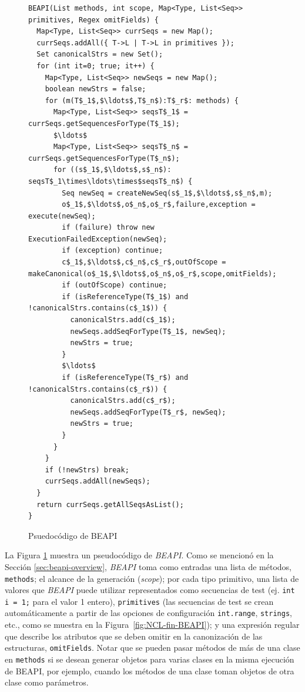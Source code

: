 \begin{figure}[ht]
\begin{lstlisting}
BEAPI(List methods, int scope, Map<Type, List<Seq>> primitives, Regex omitFields) {
  Map<Type, List<Seq>> currSeqs = new Map();
  currSeqs.addAll({ T->L | T->L in primitives });
  Set canonicalStrs = new Set();
  for (int it=0; true; it++) {
    Map<Type, List<Seq>> newSeqs = new Map();
    boolean newStrs = false;
    for (m(T$_1$,$\ldots$,T$_n$):T$_r$: methods) {
      Map<Type, List<Seq>> seqsT$_1$ = currSeqs.getSequencesForType(T$_1$);
      $\ldots$ 
      Map<Type, List<Seq>> seqsT$_n$ = currSeqs.getSequencesForType(T$_n$);
      for ((s$_1$,$\ldots$,s$_n$): seqsT$_1\times\ldots\times$seqsT$_n$) {
        Seq newSeq = createNewSeq(s$_1$,$\ldots$,s$_n$,m);
        o$_1$,$\ldots$,o$_n$,o$_r$,failure,exception = execute(newSeq);
        if (failure) throw new ExecutionFailedException(newSeq);
        if (exception) continue;
        c$_1$,$\ldots$,c$_n$,c$_r$,outOfScope = makeCanonical(o$_1$,$\ldots$,o$_n$,o$_r$,scope,omitFields);
        if (outOfScope) continue;
        if (isReferenceType(T$_1$) and !canonicalStrs.contains(c$_1$)) {
          canonicalStrs.add(c$_1$);
          newSeqs.addSeqForType(T$_1$, newSeq);
          newStrs = true;
        }
        $\ldots$
        if (isReferenceType(T$_r$) and !canonicalStrs.contains(c$_r$)) {
          canonicalStrs.add(c$_r$);
          newSeqs.addSeqForType(T$_r$, newSeq);
          newStrs = true;
        }
      }
    }
    if (!newStrs) break;
    currSeqs.addAll(newSeqs);
  }
  return currSeqs.getAllSeqsAsList();
}
\end{lstlisting}
\caption{Psuedocódigo de \textsf{BEAPI}}
\label{fig:beapi-algorithm}
\end{figure}


La Figura \ref{fig:beapi-algorithm} muestra un pseudocódigo de \emph{BEAPI}. 
Como se mencionó en la Sección \ref{sec:beapi-overview}, \emph{BEAPI} toma como
entradas una lista de métodos, \texttt{methods}; el alcance de la generación
(\emph{scope}); por cada tipo primitivo, una lista de valores que \emph{BEAPI}
puede utilizar representados como secuencias de test (ej. \texttt{int i = 1;} para
el valor 1 entero),
\texttt{primitives} (las secuencias de test se crean automáticamente a partir de las opciones de
configuración \texttt{int.range}, \texttt{strings}, etc., como se muestra en la Figura~\ref{fig:NCL-fin-BEAPI}); 
y una expresión regular que describe los atributos que se deben omitir en la canonización de las estructuras, \texttt{omitFields}. 
Notar que se pueden pasar métodos de más de una clase en \texttt{methods} si se desean generar objetos para varias clases en la misma ejecución de \textsf{BEAPI},
por ejemplo, cuando los métodos de una clase toman objetos de otra clase como parámetros. 

